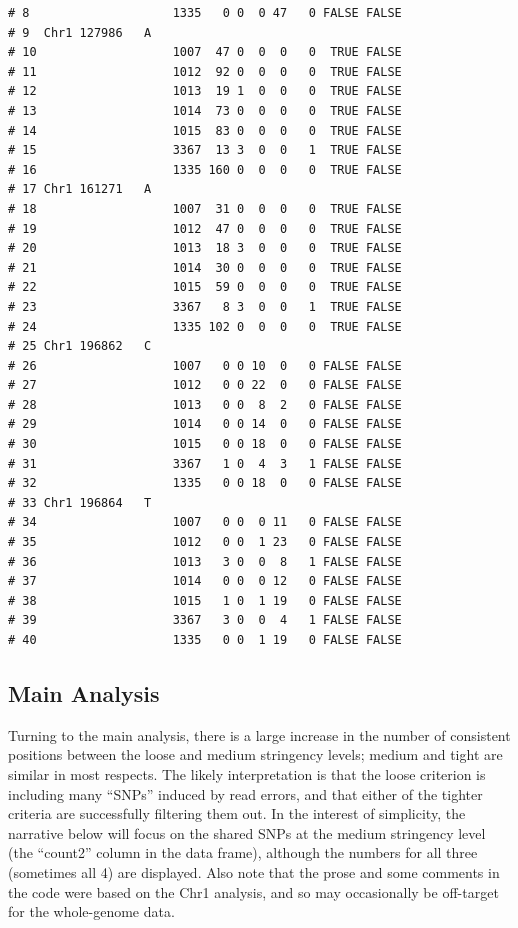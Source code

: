 \documentclass{article}\usepackage[]{graphicx}\usepackage[]{color}
\makeatletter
\newenvironment{kframe}{%
 \def\at@end@of@kframe{}%
 \ifinner\ifhmode%
  \def\at@end@of@kframe{\end{minipage}}%
  \begin{minipage}{\columnwidth}%
 \fi\fi%
 \def\FrameCommand##1{\hskip\@totalleftmargin \hskip-\fboxsep
 \colorbox{shadecolor}{##1}\hskip-\fboxsep
     \hskip-\linewidth \hskip-\@totalleftmargin \hskip\columnwidth}%
 \MakeFramed {\advance\hsize-\width
   \@totalleftmargin\z@ \linewidth\hsize
   \@setminipage}}%
 {\par\unskip\endMakeFramed%
 \at@end@of@kframe}
\newenvironment{knitrout}{}{} %
\makeatother
\begin{document}
\begin{knitrout}
\begin{kframe}
\begin{verbatim}
# 8                    1335   0 0  0 47   0 FALSE FALSE        
# 9  Chr1 127986   A                                           
# 10                   1007  47 0  0  0   0  TRUE FALSE        
# 11                   1012  92 0  0  0   0  TRUE FALSE        
# 12                   1013  19 1  0  0   0  TRUE FALSE        
# 13                   1014  73 0  0  0   0  TRUE FALSE        
# 14                   1015  83 0  0  0   0  TRUE FALSE        
# 15                   3367  13 3  0  0   1  TRUE FALSE        
# 16                   1335 160 0  0  0   0  TRUE FALSE        
# 17 Chr1 161271   A                                           
# 18                   1007  31 0  0  0   0  TRUE FALSE        
# 19                   1012  47 0  0  0   0  TRUE FALSE        
# 20                   1013  18 3  0  0   0  TRUE FALSE        
# 21                   1014  30 0  0  0   0  TRUE FALSE        
# 22                   1015  59 0  0  0   0  TRUE FALSE        
# 23                   3367   8 3  0  0   1  TRUE FALSE        
# 24                   1335 102 0  0  0   0  TRUE FALSE        
# 25 Chr1 196862   C                                           
# 26                   1007   0 0 10  0   0 FALSE FALSE        
# 27                   1012   0 0 22  0   0 FALSE FALSE        
# 28                   1013   0 0  8  2   0 FALSE FALSE        
# 29                   1014   0 0 14  0   0 FALSE FALSE        
# 30                   1015   0 0 18  0   0 FALSE FALSE        
# 31                   3367   1 0  4  3   1 FALSE FALSE        
# 32                   1335   0 0 18  0   0 FALSE FALSE        
# 33 Chr1 196864   T                                           
# 34                   1007   0 0  0 11   0 FALSE FALSE        
# 35                   1012   0 0  1 23   0 FALSE FALSE        
# 36                   1013   3 0  0  8   1 FALSE FALSE        
# 37                   1014   0 0  0 12   0 FALSE FALSE        
# 38                   1015   1 0  1 19   0 FALSE FALSE        
# 39                   3367   3 0  0  4   1 FALSE FALSE        
# 40                   1335   0 0  1 19   0 FALSE FALSE
\end{verbatim}
\end{kframe}
\end{knitrout}


\subsection{Main Analysis}
Turning to the main analysis, there is a large increase in the number of consistent positions between the loose and
medium stringency levels; medium and tight are similar in most respects.  The likely interpretation is that the loose
criterion is including many ``SNPs'' induced by read errors, and that either of the tighter criteria are successfully
filtering them out.  In the interest of simplicity, the narrative below will focus on the shared SNPs at the medium
stringency level (the ``count2'' column in the data frame), although the numbers for all three (sometimes all 4) are
displayed.  Also note that the prose and some comments in the code were based on the Chr1 analysis, and so may
occasionally be off-target for the whole-genome data.
\end{document}
